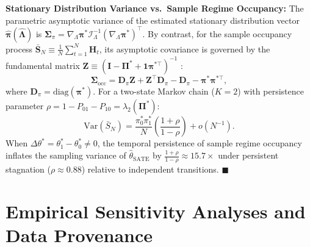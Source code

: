\documentclass[twoside]{article}
\theoremstyle{definition}
\newcommand{\Var}{\mathrm{Var}}
\begin{document}
\textbf{Stationary Distribution Variance vs.\ Sample Regime Occupancy:}
The parametric asymptotic variance of the estimated stationary distribution vector $\hat{\boldsymbol{\pi}}(\hat{\boldsymbol{\Lambda}})$ is $\boldsymbol{\Sigma}_\pi = \nabla_\Lambda \boldsymbol{\pi}^* \mathcal{I}_\Lambda^{-1} (\nabla_\Lambda \boldsymbol{\pi}^*)^\top$.
By contrast, for the sample occupancy process $\bar{\boldsymbol{S}}_N \equiv \frac{1}{N}\sum_{t=1}^N \boldsymbol{H}_t$, its asymptotic covariance is governed by the fundamental matrix $\mathbf{Z} \equiv (\mathbf{I} - \boldsymbol{\Pi}^* + \mathbf{1}\boldsymbol{\pi}^{*\top})^{-1}$ \citep{kemeny1976finite}:
\begin{equation}
    \boldsymbol{\Sigma}_{\mathrm{occ}} = \mathbf{D}_{\pi} \mathbf{Z} + \mathbf{Z}^\top \mathbf{D}_{\pi} - \mathbf{D}_{\pi} - \boldsymbol{\pi}^* \boldsymbol{\pi}^{*\top},
\end{equation}
where $\mathbf{D}_{\pi} = \mathrm{diag}(\boldsymbol{\pi}^*)$.
For a two-state Markov chain ($K=2$) with persistence parameter $\rho = 1 - P_{01} - P_{10} = \lambda_2(\boldsymbol{\Pi}^*)$:
\begin{equation}
    \Var(\bar{S}_N) = \frac{\pi_0^* \pi_1^*}{N} \left( \frac{1 + \rho}{1 - \rho} \right) + o(N^{-1}).
\end{equation}
When $\Delta \theta^* = \theta_1^* - \theta_0^* \neq 0$, the temporal persistence of sample regime occupancy inflates the sampling variance of $\hat{\theta}_{\mathrm{SATE}}$ by $\frac{1+\rho}{1-\rho} \approx 15.7\times$ under persistent stagnation ($\rho \approx 0.88$) relative to independent transitions. $\blacksquare$

\vspace{-2mm}
\section{Empirical Sensitivity Analyses and Data Provenance}
\label{app:empirical_sensitivity}
\end{document}
